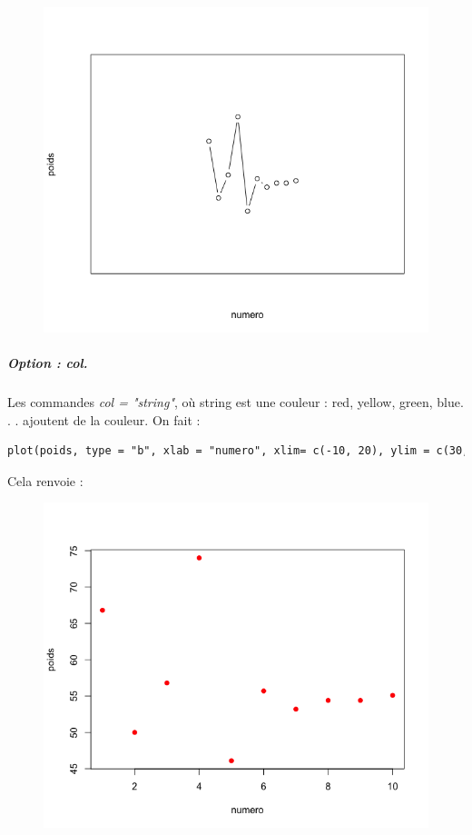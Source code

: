 \begin{figure}[H]\begin{center}\includegraphics[scale=0.4]{ilu/gra16.png}\end{center}\end{figure}
\subparagraph{Option : col.} 
Les commandes \textit{col = "string"}, où string est une couleur : red, yellow, green, blue. . . ajoutent de la couleur.\newline
On fait :
\begin{lstlisting}[language=html]
plot(poids, type = "b", xlab = "numero", xlim= c(-10, 20), ylim = c(30, 90), xaxt="n",yaxt="n")
\end{lstlisting}
Cela renvoie :
\begin{figure}[H]\begin{center}\includegraphics[scale=0.4]{ilu/gra17.png}\end{center}\end{figure}
